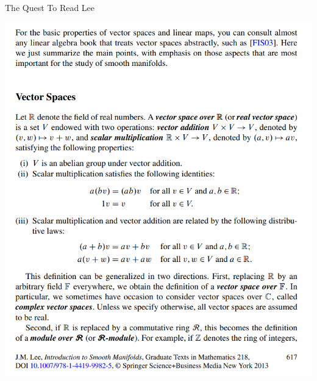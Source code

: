 \documentclass[oneside]{book}
\theoremstyle{definition}
\theoremstyle{plain}
\theoremstyle{remark}
\theoremstyle{plain}
\begin{document}
\fmmfamily
\begin{center}
    \fontsize{35}{41}\selectfont The Quest To Read Lee
\end{center}
\begin{center}
    \vspace*{\fill}
\includegraphics[scale=0.5]{Lee Vector Spaces.png}
\vspace*{\fill}
\end{center}
\end{document}
